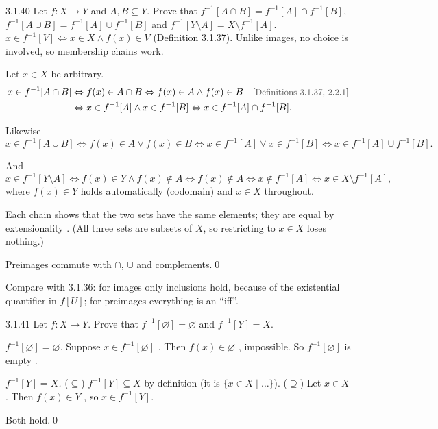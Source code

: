 \begin{bookex}[recommended]{3.1.40}
Let $f:X\to Y$ and $A,B\subseteq Y$. Prove that $f^{-1}[A\cap B]=f^{-1}[A]\cap f^{-1}[B]$, $f^{-1}[A\cup B]=f^{-1}[A]\cup f^{-1}[B]$ and $f^{-1}[Y\setminus A]=X\setminus f^{-1}[A]$.
\solution
\given $x\in f^{-1}[V]\Leftrightarrow x\in X\wedge f(x)\in V$ (Definition 3.1.37). Unlike images, no choice is involved, so membership chains work.
\begin{steps}
\item Let $x\in X$ be arbitrary.
\begin{align*}
x\in f^{-1}[A\cap B]&\Leftrightarrow f(x)\in A\cap B\Leftrightarrow f(x)\in A\wedge f(x)\in B\why{Definitions 3.1.37, 2.2.1}\\
&\Leftrightarrow x\in f^{-1}[A]\wedge x\in f^{-1}[B]\Leftrightarrow x\in f^{-1}[A]\cap f^{-1}[B].
\end{align*}
\item Likewise
\[
x\in f^{-1}[A\cup B]\Leftrightarrow f(x)\in A\vee f(x)\in B\Leftrightarrow x\in f^{-1}[A]\vee x\in f^{-1}[B]\Leftrightarrow x\in f^{-1}[A]\cup f^{-1}[B].
\]
\item And
\[
x\in f^{-1}[Y\setminus A]\Leftrightarrow f(x)\in Y\wedge f(x)\notin A\Leftrightarrow f(x)\notin A\Leftrightarrow x\notin f^{-1}[A]\Leftrightarrow x\in X\setminus f^{-1}[A],
\]
where $f(x)\in Y$ holds automatically (codomain) and $x\in X$ throughout.
\item Each chain shows that the two sets have the same elements; they are equal by extensionality . (All three sets are subsets of $X$, so restricting to $x\in X$ loses nothing.)
\end{steps}
\conclusion Preimages commute with $\cap$, $\cup$ and complements.\qed
\begin{compare}
\item Compare with 3.1.36: for images only inclusions hold, because of the existential quantifier in $f[U]$; for preimages everything is an ``iff''.
\end{compare}
\end{bookex}

\begin{bookex}[recommended]{3.1.41}
Let $f:X\to Y$. Prove that $f^{-1}[\varnothing]=\varnothing$ and $f^{-1}[Y]=X$.
\solution
\begin{steps}
\item \emph{$f^{-1}[\varnothing]=\varnothing$.} Suppose $x\in f^{-1}[\varnothing]$ . Then $f(x)\in\varnothing$ , impossible. So $f^{-1}[\varnothing]$ is empty .
\item \emph{$f^{-1}[Y]=X$.} ($\subseteq$) $f^{-1}[Y]\subseteq X$ by definition (it is $\{x\in X\mid\dots\}$). ($\supseteq$) Let $x\in X$. Then $f(x)\in Y$ , so $x\in f^{-1}[Y]$.
\end{steps}
\conclusion Both hold.\qed
\end{bookex}

